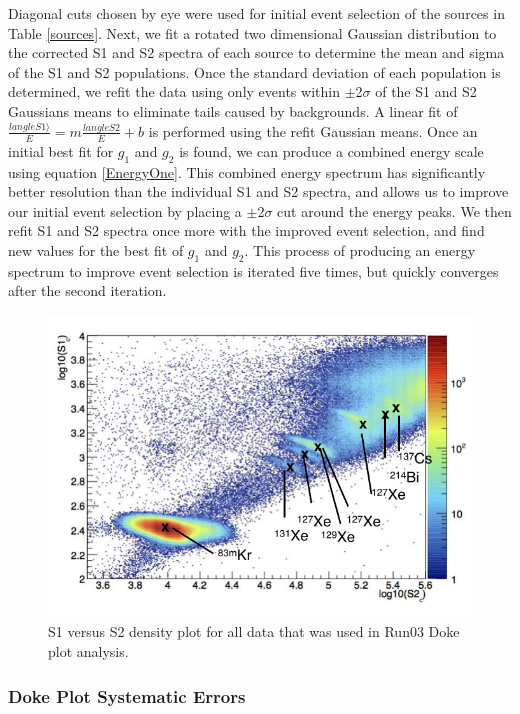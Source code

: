 \documentclass[a4paper,12pt]{article}
\begin{document}
{Diagonal cuts chosen by eye were used for initial event selection of the sources in Table \ref{sources}. Next, we fit a rotated two dimensional Gaussian distribution to the corrected S1 and S2 spectra of each source to determine the mean and sigma of the S1 and S2 populations. Once the standard deviation of each population is determined, we refit the data using only events within $\pm$2$\sigma$ of the S1 and S2 Gaussians means to eliminate tails caused by backgrounds.  A linear fit of $\frac{langle S1 \rangle}{E} = m \frac{langle S2}{E} + b$ is performed using the refit Gaussian means.  Once an initial best fit for $g_1$ and $g_2$ is found, we can produce a combined energy scale using equation \ref{EnergyOne}.  This combined energy spectrum has significantly better resolution than the individual S1 and S2 spectra, and allows us to improve our initial event selection by placing a $\pm$2$\sigma$ cut around the energy peaks.  We then refit S1 and S2 spectra once more with the improved event selection, and find new values for the best fit of $g_1$ and $g_2$.  This process of producing an energy spectrum to improve event selection is iterated five times, but quickly converges after the second iteration.

\begin{figure}[H]
\centering
\includegraphics[scale=1]{Monoenergetic_gamma_sources.png}
\caption{S1 versus S2 density plot for all data that was used in Run03 Doke plot analysis.}
\label{alleventselection}
\end{figure}


\subsubsection{Doke Plot Systematic Errors}

}
\end{document}

